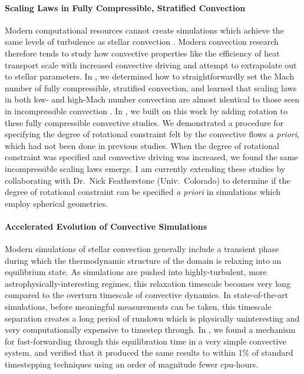 \documentclass[onecolumn, hmargin=1in, vmargin=1in]{aastex62}
\begin{document}
\paragraph{Scaling Laws in Fully Compressible, Stratified Convection}
Modern computational resources cannot create simulations which achieve the same levels of turbulence as stellar convection \citep{brummell&all2002}.
Modern convection research therefore tends to study how convective properties like the efficiency of heat transport scale with increased convective driving and attempt to extrapolate out to stellar parameters.
In \citet{anders&brown2017}, we determined how to straightforwardly set the Mach number of fully compressible, stratified convection, and learned that scaling laws in both low- and high-Mach number convection are almost identical to those seen in incompressible convection \citep{ahlers&all2009}.
In \citet{anders&all2019}, we built on this work by adding rotation to these fully compressible convective studies.
We demonstrated a procedure for specifying the degree of rotational constraint felt by the convective flows \emph{a priori}, which had not been done in previous studies.
When the degree of rotational constraint was specified and convective driving was increased, we found the same incompressible scaling laws emerge.
I am currently extending these studies by collaborating with Dr.~Nick Featherstone (Univ.~Colorado) to determine if the degree of rotational constraint can be specified \emph{a priori} in simulations which employ spherical geometries.

\paragraph{Accelerated Evolution of Convective Simulations}
Modern simulations of stellar convection generally include a transient phase during which the thermodynamic structure of the domain is relaxing into an equilibrium state.
As simulations are pushed into highly-turbulent, more astrophysically-interesting regimes, this relaxation timescale becomes very long compared to the overturn timescale of convective dynamics.
In state-of-the-art simulations, before meaningful measurements can be taken, this timescale separation creates a long period of rundown which is physically uninteresting and very computationally expensive to timestep through.
In \citet{anders&all2018}, we found a mechanism for fast-forwarding through this equilibration time in a very simple convective system, and verified that it produced the same results to within 1\% of standard timestepping techniques using an order of magnitude fewer cpu-hours.
\end{document}
